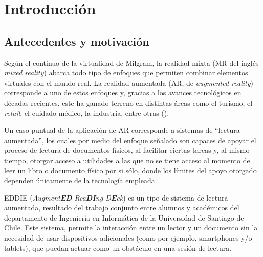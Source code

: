 \chapter{Introducci\'on}
\label{cap:introduccion}

\section{Antecedentes y motivación}
\label{intro:motivacion}
Según el continuo de la virtualidad de Milgram, la realidad mixta (MR del inglés \textit{mixed reality}) abarca todo tipo de enfoques que permiten combinar elementos virtuales con el mundo real. La realidad aumentada (AR, de \textit{augmented reality}) corresponde a uno de estos enfoques y, gracias a los avances tecnológicos en décadas recientes, este ha ganado terreno en distintas áreas como el turismo, el \textit{retail}, el cuidado médico, la industria, entre otras (\cite{jung_dieck_2018}).

Un caso puntual de la aplicación de AR corresponde a sistemas de ``lectura aumentada'', los cuales por medio del enfoque señalado son capaces de apoyar el proceso de lectura de documentos físicos, al facilitar ciertas tareas y, al mismo tiempo, otorgar acceso a utilidades a las que no se tiene acceso al momento de leer un libro o documento físico por si sólo, donde los límites del apoyo otorgado dependen únicamente de la tecnología empleada. 

EDDIE (\textit{Augment\textbf{ED} Rea\textbf{DI}ng D\textbf{E}ck}) es un tipo de sistema de lectura aumentada, resultado del trabajo conjunto entre alumnos y académicos del departamento de Ingeniería en Informática de la Universidad de Santiago de Chile. Este sistema, permite la interacción entre un lector y un documento sin la necesidad de usar dispositivos adicionales (como por ejemplo, smartphones y/o tablets), que puedan actuar como un obstáculo en una sesión de lectura.



